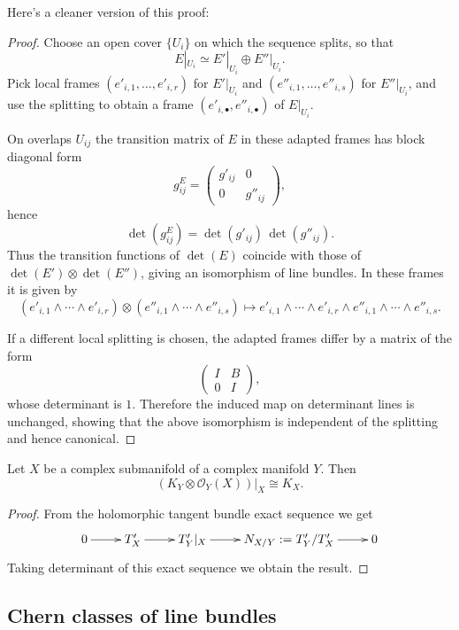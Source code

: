 \noindent
Here's a cleaner version of this proof:

\begin{proof}
Choose an open cover $\{U_i\}$ on which the
sequence splits, so that
\[
E|_{U_i}\simeq E'|_{U_i}\oplus E''|_{U_i}.
\]
Pick local frames $(e'_{i,1},\dots,e'_{i,r})$
for $E'|_{U_i}$ and
$(e''_{i,1},\dots,e''_{i,s})$ for
$E''|_{U_i}$, and use the splitting to obtain
a frame $(e'_{i,\bullet},e''_{i,\bullet})$ of
$E|_{U_i}$.

On overlaps $U_{ij}$ the transition matrix of
$E$ in these adapted frames has
block diagonal form
\[
g^E_{ij}=
\begin{pmatrix}
g'_{ij} & 0\\
0 & g''_{ij}
\end{pmatrix},
\]
hence
\[
\det(g^E_{ij})=\det(g'_{ij})\,\det(g''_{ij}).
\]
Thus the transition functions of $\det(E)$
coincide with those of
$\det(E')\otimes\det(E'')$, giving an
isomorphism of line bundles. In these
frames it is given by
\[
(e'_{i,1}\wedge\cdots\wedge e'_{i,r})\otimes
(e''_{i,1}\wedge\cdots\wedge e''_{i,s})
\longmapsto
e'_{i,1}\wedge\cdots\wedge e'_{i,r}\wedge
e''_{i,1}\wedge\cdots\wedge e''_{i,s}.
\]

If a different local splitting is chosen, the
adapted frames differ by a
matrix of the form
\[
\begin{pmatrix}
I & B\\
0 & I
\end{pmatrix},
\]
whose determinant is $1$. Therefore the
induced map on determinant lines is
unchanged, showing that the above isomorphism
is independent of the splitting
and hence canonical.
\end{proof}

\begin{theorem}
\label{theorem-adjunction-ii}
Let $X$ be a complex submanifold of a complex
manifold $Y$.
Then
\begin{equation}
\label{equation-adjunction-ii}
(K_Y\otimes \mathcal{O}_Y(X))|_{X}\cong K_X.
\end{equation}
\end{theorem}

\begin{proof}
From the holomorphic tangent bundle exact
sequence we get
$$
\xymatrix{
0\ar[r]
&T'_X\ar[r]
&T'_Y|_{X}\ar[r]
&N_{X/Y}:=T'_Y/T'_X\ar[r]
&0
}
$$
Taking determinant of this exact sequence we
obtain the result.
\end{proof}


\subsection{Chern classes of line bundles}
\label{subsection-chern-classes-line-bundles}

